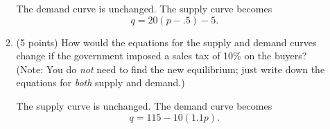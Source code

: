 \documentclass{article}
\begin{document}
\begin{enumerate}
\begin{enumerate}
\begin{KEY} The demand curve is unchanged. The supply curve becomes \[q=20(p-.5)-5.\]  \end{KEY}


    \item \begin{EXAM}(5 points) How would the equations for the supply and demand curves change if the government imposed a sales tax of 10\% on the buyers? (Note: You do \emph{not} need to find the new equilibrium; just write down the equations for \emph{both} supply and demand.) \vspace{2cm} \end{EXAM}

\begin{KEY} The supply curve is unchanged. The demand curve becomes \[q=115-10(1.1p).\] \end{KEY}

    \end{enumerate}














\end{enumerate}
\end{document}

